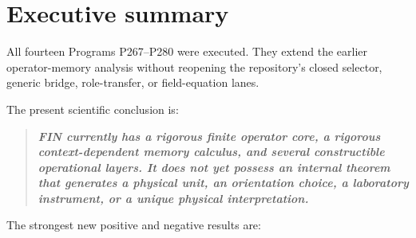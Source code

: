 \documentclass[11pt,a4paper,openany]{report}
\begin{document}
\chapter{Executive summary}

All fourteen Programs P267--P280 were executed. They extend the earlier operator-memory analysis without reopening the repository's closed selector, generic bridge, role-transfer, or field-equation lanes.

The present scientific conclusion is:

\begin{quote}\itshape
\textbf{FIN currently has a rigorous finite operator core, a rigorous context-dependent memory calculus, and several constructible operational layers. It does not yet possess an internal theorem that generates a physical unit, an orientation choice, a laboratory instrument, or a unique physical interpretation.}

\end{quote}

The strongest new positive and negative results are:
\end{document}
